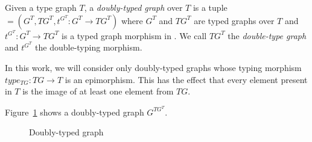 \begin{definition} Given a type graph $T$, a \emph{doubly-typed graph} \doublyTypedGraph{} over $T$ is a tuple \doublyTypedGraph $= \left(G^T,TG^T, t^{G^T} : G^T \rightarrow TG^T\right)$ where $G^T$ and $TG^T$ are typed graphs over $T$ and \mbox{$t^{G^T} : G^T \rightarrow TG^T$} is a typed graph morphism in \typedGraphCategory{}. We call $TG^T$ the \emph{double-type graph} and $t^{G^T}$ the double-typing morphism.
\end{definition}

\begin{remark} In this work, we will consider only doubly-typed graphs whose typing morphism $type_{TG} : TG \rightarrow T$ is an epimorphism. This has the effect that every element present in $T$ is the image of at least one element from $TG$.
\end{remark}

\begin{example} Figure~\ref{fig:process:doubly-typed-graph} shows a doubly-typed graph $G^{TG^T}$.
\end{example}

\begin{figure}[!ht]
  \centering
  \caption{Doubly-typed graph}\label{fig:process:doubly-typed-graph}
\end{figure}

